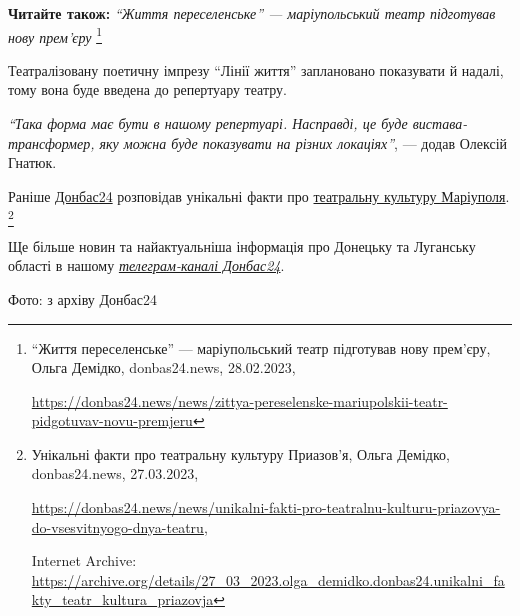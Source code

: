 \textbf{Читайте також:} \emph{\enquote{Життя переселенське} — маріупольський театр підготував нову прем'єру}%
\footnote{\enquote{Життя переселенське} — маріупольський театр підготував нову прем'єру, Ольга Демідко, donbas24.news, 28.02.2023, \par%
\url{https://donbas24.news/news/zittya-pereselenske-mariupolskii-teatr-pidgotuvav-novu-premjeru}%
}


Театралізовану поетичну імпрезу \enquote{Лінії життя} заплановано показувати й надалі,
тому вона буде введена до репертуару театру.

\begin{leftbar}
\emph{\enquote{Така форма має бути в нашому репертуарі. Насправді, це буде
вистава-трансформер, яку можна буде показувати на різних локаціях}}, —
додав Олексій Гнатюк.
\end{leftbar}


Раніше \href{https://donbas24.news}{Донбас24} розповідав унікальні факти про \href{https://donbas24.news/news/unikalni-fakti-pro-teatralnu-kulturu-priazovya-do-vsesvitnyogo-dnya-teatru}{театральну культуру Маріуполя}.%
\footnote{Унікальні факти про театральну культуру Приазов'я, Ольга Демідко, donbas24.news, 27.03.2023, %
\par\url{https://donbas24.news/news/unikalni-fakti-pro-teatralnu-kulturu-priazovya-do-vsesvitnyogo-dnya-teatru}, \par%
Internet Archive: \url{https://archive.org/details/27_03_2023.olga_demidko.donbas24.unikalni_fakty_teatr_kultura_priazovja}%
}

Ще більше новин та найактуальніша інформація про Донецьку та Луганську області
в нашому \emph{\href{https://t.me/donbas24}{телеграм-каналі Донбас24}}.

Фото: з архіву Донбас24

